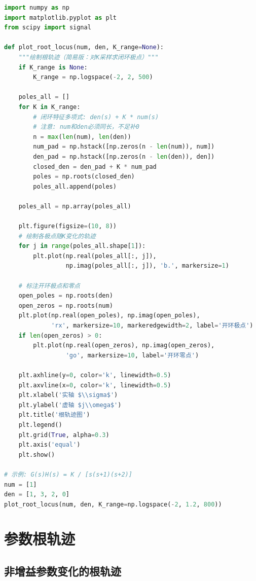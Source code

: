 \begin{lstlisting}[language=Python]
import numpy as np
import matplotlib.pyplot as plt
from scipy import signal

def plot_root_locus(num, den, K_range=None):
    """绘制根轨迹（简易版：对K采样求闭环极点）"""
    if K_range is None:
        K_range = np.logspace(-2, 2, 500)

    poles_all = []
    for K in K_range:
        # 闭环特征多项式: den(s) + K * num(s)
        # 注意: num和den必须同长，不足补0
        n = max(len(num), len(den))
        num_pad = np.hstack([np.zeros(n - len(num)), num])
        den_pad = np.hstack([np.zeros(n - len(den)), den])
        closed_den = den_pad + K * num_pad
        poles = np.roots(closed_den)
        poles_all.append(poles)

    poles_all = np.array(poles_all)

    plt.figure(figsize=(10, 8))
    # 绘制各极点随K变化的轨迹
    for j in range(poles_all.shape[1]):
        plt.plot(np.real(poles_all[:, j]), 
                 np.imag(poles_all[:, j]), 'b.', markersize=1)

    # 标注开环极点和零点
    open_poles = np.roots(den)
    open_zeros = np.roots(num)
    plt.plot(np.real(open_poles), np.imag(open_poles), 
             'rx', markersize=10, markeredgewidth=2, label='开环极点')
    if len(open_zeros) > 0:
        plt.plot(np.real(open_zeros), np.imag(open_zeros), 
                 'go', markersize=10, label='开环零点')

    plt.axhline(y=0, color='k', linewidth=0.5)
    plt.axvline(x=0, color='k', linewidth=0.5)
    plt.xlabel('实轴 $\\sigma$')
    plt.ylabel('虚轴 $j\\omega$')
    plt.title('根轨迹图')
    plt.legend()
    plt.grid(True, alpha=0.3)
    plt.axis('equal')
    plt.show()

# 示例: G(s)H(s) = K / [s(s+1)(s+2)]
num = [1]
den = [1, 3, 2, 0]
plot_root_locus(num, den, K_range=np.logspace(-2, 1.2, 800))
\end{lstlisting}

\section{参数根轨迹}

\subsection{非增益参数变化的根轨迹}

